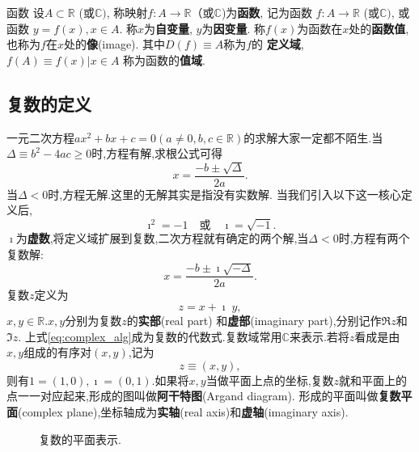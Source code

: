 \begin{definition}{函数}
    设$A \subset \mathbb{R} $ (或$\mathbb{C})$, 称映射$f: A\to \mathbb{R} $（或$\mathbb{C}$)为\textbf{函数}, 记为函数 
    $f: A\to  \mathbb{R} $ (或$\mathbb{C})$, 或函数 $y = f(x), x \in A$. 称$x$为\textbf{自变量}, $y$为\textbf{因变量}.
    称$f(x)$为函数在$x$处的\textbf{函数值}, 也称为$f$在$x$处的\textbf{像}(image).
    其中$D(f) \equiv A$称为$f$的 \textbf{定义域},  $f(A) \equiv { f(x) | x \in A} $ 称为函数的\textbf{值域}.

\end{definition}

\subsection{复数的定义}
一元二次方程$a x^2 + b x + c = 0 (a\neq 0, b,c \in \mathbb{R})$的求解大家一定都不陌生.当$\Delta \equiv b^2 - 4 a c \geq 0$时,方程有解,求根公式可得
\begin{equation}
    x = \frac{-b \pm \sqrt{\Delta}}{2a} .
\end{equation}
当$\Delta < 0$时,方程无解.这里的无解其实是指没有实数解.
当我们引入以下这一核心定义后,
\begin{equation}
    \imath ^2 = -1 \quad \textrm{或} \quad \imath = \sqrt{-1} . 
\end{equation}
$\imath$为{\bf 虚数},将定义域扩展到复数,二次方程就有确定的两个解,当$\Delta < 0$时,方程有两个复数解:
\begin{equation}
    x = \frac{-b \pm \imath \sqrt{-\Delta}}{2a} .
\end{equation}
复数$z$定义为
\begin{equation}
    \label{eq:complex_alg}
    z = x + \imath \; y ,
\end{equation}
$x,y \in {\mathbb{R}}$.$x,y$分别为复数$z$的{\bf 实部}(real part) 和{\bf 虚部}(imaginary part),分别记作$\Re z$和$\Im z$.
上式\eqref{eq:complex_alg}成为复数的代数式.复数域常用$\mathbb{C}$来表示.若将$z$看成是由$x,y$组成的有序对$(x,y)$,记为
\begin{equation}
    z \equiv (x,y),
\end{equation}
则有$1 = (1,0), \imath = (0, 1)$.如果将$x,y$当做平面上点的坐标,复数$z$就和平面上的点一一对应起来,形成的图叫做\textbf{阿干特图}(Argand diagram).
形成的平面叫做{\bf 复数平面}(complex plane),坐标轴成为{\bf 实轴}(real axis)和{\bf 虚轴}(imaginary axis).
\begin{figure}[htb]
    \centering
    
  \caption{复数的平面表示.} \label{fig:complex_plane}
\end{figure} 
